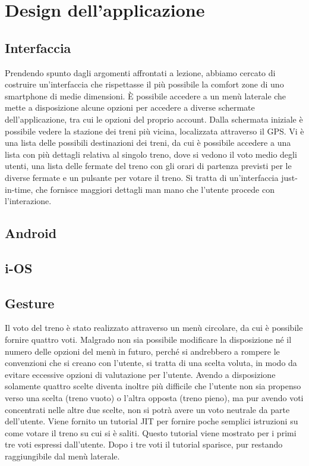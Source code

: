 \chapter{Design dell'applicazione\label{sec:design}}

\section{Interfaccia\label{sec:interfaccia}}
Prendendo spunto dagli argomenti affrontati a lezione, abbiamo cercato di costruire un'interfaccia che rispettasse il più possibile la comfort zone di uno smartphone di medie dimensioni.
È possibile accedere a un menù laterale che mette a disposizione alcune opzioni per accedere a diverse schermate dell'applicazione, tra cui le opzioni del proprio account.
Dalla schermata iniziale è possibile vedere la stazione dei treni più vicina, localizzata attraverso il GPS.
Vi è una lista delle possibili destinazioni dei treni, da cui è possibile accedere a una lista con più dettagli relativa al singolo treno, dove si vedono il voto medio degli utenti, una lista delle fermate del treno con gli orari di partenza previsti per le diverse fermate e un pulsante per votare il treno.
Si tratta di un'interfaccia just-in-time, che fornisce maggiori dettagli man mano che l'utente procede con l'interazione.

\section{Android\label{sec:android}}

\section{i-OS\label{sec:i-os}}

\section{Gesture\label{sec:gesture}}
Il voto del treno è stato realizzato attraverso un menù circolare, da cui è possibile fornire quattro voti.
Malgrado non sia possibile modificare la disposizione né il numero delle opzioni del menù in futuro, perché si andrebbero a rompere le convenzioni che si creano con l'utente, si tratta di una scelta voluta, in modo da evitare eccessive opzioni di valutazione per l'utente.
Avendo a disposizione solamente quattro scelte diventa inoltre più difficile che l'utente non sia propenso verso una scelta (treno vuoto) o l'altra opposta (treno pieno), ma pur avendo voti concentrati nelle altre due scelte, non si potrà avere un voto neutrale da parte dell'utente.
Viene fornito un tutorial JIT per fornire poche semplici istruzioni su come votare il treno su cui si è saliti.
Questo tutorial viene mostrato per i primi tre voti espressi dall'utente.
Dopo i tre voti il tutorial sparisce, pur restando raggiungibile dal menù laterale.